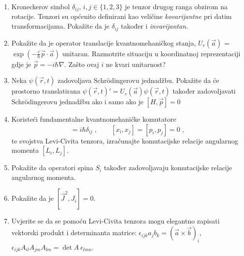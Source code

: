 \begin{enumerate}[label=\arabic{chapter}.\arabic*.]

\item \label{zad:kronecker} Kroneckerov simbol $\delta_{ij}$, $i,j \in \{1, 2, 3\}$ je tenzor drugog ranga
    obzirom na rotacije. Tenzori su općenito definirani kao veličine 
    \emph{kovarijantne} pri datim transformacijama. Pokažite da je $\delta_{ij}$
    također i \emph{invarijantan}.
\item Pokažite da je operator translacije kvantnomehaničkog stanja,
 $U_{r}(\vec{a})$ = $\exp (-\frac{i}{\hbar} \vec{p}\cdot \vec{a} )$
unitaran. Razmotrite situaciju u koordinatnoj reprezentaciji gdje
je $\vec{p} = -i \hbar \nabla$. Zašto ovaj $i$ ne kvari unitarnost?

\item Neka $\psi(\vec{r}, t)$ zadovoljava Schr\"{o}dingerovu jednadžbu.
Pokažite da će prostorno translatirana $\psi(\vec{r}, t)' = 
U_{r}(\vec{a}) \psi(\vec{r}, t)$ također zadovoljavati Schr\"{o}dingerovu
jednadžbu ako i samo ako je $[H, \vec{p}] = 0$

\item Koristeći fundamentalne kvantnomehaničke komutatore
\begin{equation}
 [x_i, p_j] = i\hbar \delta_{ij}\;, \qquad
 [x_i, x_j] = [p_i, p_j] = 0 \;,
\end{equation}
te svojstva Levi-Civita tenzora, izračunajte komutacijske
relacije angularnog momenta $[L_i, L_j]$.

\item Pokažite da operatori spina $S_i$ također zadovoljavaju komutacijske
relacije angularnog momenta.

\item Pokažite da je $[\vec{J}^2, J_i] = 0$.
\item \label{zad:levicivita} Uvjerite se da se pomoću Levi-Civita tenzora mogu elegantno zapisati
    vektorski produkt i determinanta matrice: $\epsilon_{ijk}a_{j}b_{k}
    = (\vec{a}\times\vec{b})_{i}$, $\epsilon_{ijk}A_{il}A_{jm}A_{kn} = \det A \: \epsilon_{lmn}$.
\end{enumerate}
